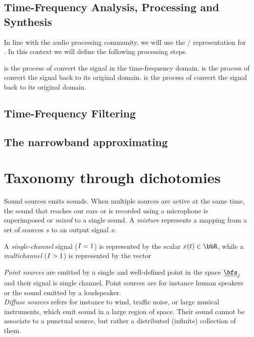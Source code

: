 \subsection{Time-Frequency Analysis, Processing and Synthesis}
In line with the audio processing community, we will use the \TF/ representation for .
In this context we will define the following processing steps.

 is the process of convert the signal in the time-frequency domain.
 is the process of convert the signal back to its original domain.
 is the process of convert the signal back to its original domain.

\subsection{Time-Frequency Filtering}

\subsection{The narrowband approximating}

\section{Taxonomy through dichotomies}
\cite{vincent2018audio}

Sound sources emits sounds.
When multiple sources are active at the same time, the sound that reaches our ears or is recorded using a microphone is superimposed or \textit{mixed} to a single sound.
A \textit{mixture} represents a mapping from a set of sources $s$ to an output signal $x$.

A \textit{single-channel} signal ($I = 1$) is represented by the scalar $\mic(t) \in \R$,
while a \textit{multichannel} ($I >   1$) is represented by the vector

\textit{Point sources} are emitted by a single and well-defined point in the space $\positionSource_\idxSrc$ and their signal is single channel.
Point sources are for instance human speakers or the sound emitted by a loudspeaker.
\\\textit{Diffuse sources} refers for instance to wind, traffic noise, or large musical instruments, which emit sound in a large region of space.
Their sound cannot be associate to a punctual source, but rather a distributed (infinite) collection of them.

